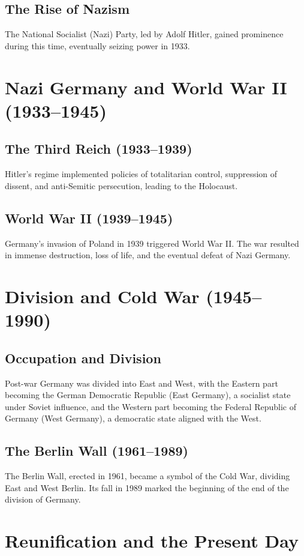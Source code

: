 \documentclass[a4paper,12pt]{book}
\begin{document}
\subsection{The Rise of Nazism}
The National Socialist (Nazi) Party, led by Adolf Hitler, gained prominence during this time, eventually seizing power in 1933.

\section{Nazi Germany and World War II (1933–1945)}
\label{sec:nazi-germany-ww2}
\subsection{The Third Reich (1933–1939)}
Hitler’s regime implemented policies of totalitarian control, suppression of dissent, and anti-Semitic persecution, leading to the Holocaust.

\subsection{World War II (1939–1945)}
Germany’s invasion of Poland in 1939 triggered World War II. The war resulted in immense destruction, loss of life, and the eventual defeat of Nazi Germany.

\section{Division and Cold War (1945–1990)}
\label{sec:division-cold-war}
\subsection{Occupation and Division}
Post-war Germany was divided into East and West, with the Eastern part becoming the German Democratic Republic (East Germany), a socialist state under Soviet influence, and the Western part becoming the Federal Republic of Germany (West Germany), a democratic state aligned with the West.

\subsection{The Berlin Wall (1961–1989)}
The Berlin Wall, erected in 1961, became a symbol of the Cold War, dividing East and West Berlin. Its fall in 1989 marked the beginning of the end of the division of Germany.

\section{Reunification and the Present Day}
\label{sec:reunification-present-day}
\end{document}
